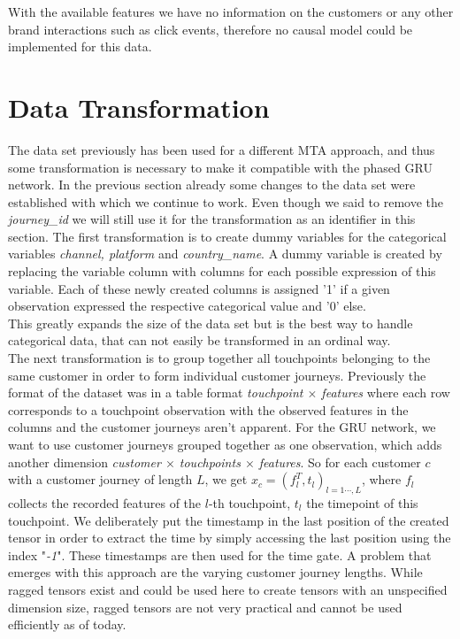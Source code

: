 With the available features we have no information on the customers or any other brand interactions such as click events, therefore no causal model could be implemented for this data. 

\section{Data Transformation}

The data set previously has been used for a different MTA approach, and thus some transformation is necessary to make it compatible with the phased GRU network. 
In the previous section already some changes to the data set were established with which we continue to work. 
Even though we said to remove the \textit{journey\_id} we will still use it for the transformation as an identifier in this section. 
The first transformation is to create dummy variables for the categorical variables \textit{channel, platform} and \textit{country\_name}. A dummy variable is created by replacing the variable column with columns for each possible expression of this variable. Each of these newly created columns is assigned '1' if a given observation expressed the respective categorical value and '0' else.\\
This greatly expands the size of the data set but is the best way to handle categorical data, that can not easily be transformed in an ordinal way. \\
The next transformation is to group together all touchpoints belonging to the same customer in order to form individual customer journeys. Previously the format of the dataset was in a table format \textit{touchpoint $\times$ features} where each row corresponds to a touchpoint observation with the observed features in the columns and the customer journeys aren't apparent. 
For the GRU network, we want to use customer journeys grouped together as one observation, which adds another dimension \textit{customer $\times$ touchpoints $\times$ features}. So for each customer $c$ with a customer journey of length $L$, we get $x_c=( f_l^T, t_l)_{l=1\cdots, L}$, where $f_l$ collects the recorded features of the $l$-th touchpoint, $t_l$ the timepoint of this touchpoint. We deliberately put the timestamp in the last position of the created tensor in order to extract the time by simply accessing the last position using the index "\textit{-1}". These timestamps are then used for the time gate. 
A problem that emerges with this approach are the varying customer journey lengths. While ragged tensors exist and could be used here to create tensors with an unspecified dimension size, ragged tensors are not very practical and cannot be used efficiently as of today. 
